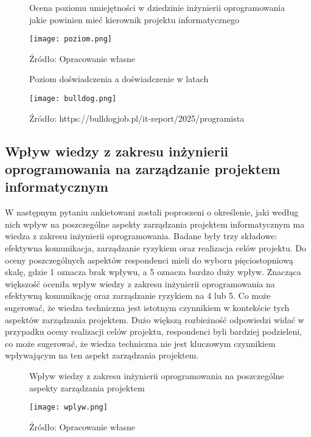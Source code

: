 \begin{figure}
  \caption{Ocena poziomu umiejętności w dziedzinie inżynierii oprogramowania jakie powinien mieć kierownik projektu informatycznego}
  \centering
  \texttt{[image: poziom.png]}
  \caption*{Źródło: Opracowanie własne}
\end{figure}

\begin{figure}
  \caption{Poziom doświadczenia a doświadczenie w latach}
  \centering
  \texttt{[image: bulldog.png]}
  \caption*{Źródło: https://bulldogjob.pl/it-report/2025/programista}
\end{figure}

\subsection{Wpływ wiedzy z zakresu inżynierii oprogramowania na zarządzanie projektem informatycznym}
W następnym pytaniu ankietowani zostali poproszeni o określenie, jaki według nich wpływ na poszczególne aspekty zarządzania projektem informatycznym ma wiedza z zakresu inżynierii oprogramowania. Badane były trzy składowe: efektywna komunikacja, zarządzanie ryzykiem oraz realizacja celów projektu. Do oceny poszczególnych aspektów respondenci mieli do wyboru pięciostopniową skalę, gdzie 1 oznacza brak wpływu, a 5 oznacza bardzo duży wpływ. Znacząca większość oceniła wpływ wiedzy z zakresu inżynierii oprogramowania na efektywną komunikację oraz zarządzanie ryzykiem na 4 lub 5. Co może sugerować, że wiedza techniczna jest istotnym czynnikiem w kontekście tych aspektów zarządzania projektem. Dużo większą rozbieżność odpowiedzi widać w przypadku oceny realizacji celów projektu, respondenci byli bardziej podzieleni, co może sugerować, że wiedza techniczna nie jest kluczowym czynnikiem wpływającym na ten aspekt zarządzania projektem.

\begin{figure}
  \caption{Wpływ wiedzy z zakresu inżynierii oprogramowania na poszczególne aspekty zarządzania projektem}
  \centering
  \texttt{[image: wplyw.png]}
  \caption*{Źródło: Opracowanie własne}
\end{figure}


